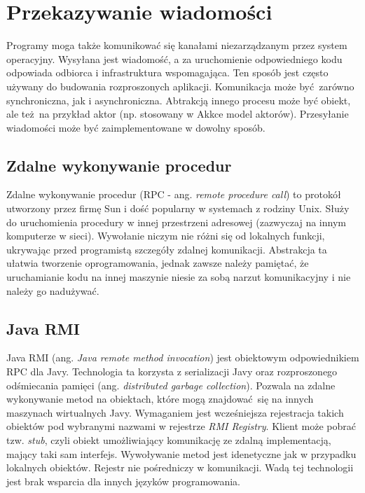 \section{Przekazywanie wiadomości}

Programy moga także komunikować się kanałami niezarządzanym przez system operacyjny. Wysyłana jest wiadomość, a za uruchomienie odpowiedniego kodu odpowiada odbiorca i infrastruktura wspomagająca. Ten sposób jest często używany do budowania rozproszonych aplikacji. Komunikacja może być zarówno synchroniczna, jak i asynchroniczna. Abtrakcją innego procesu może być obiekt, ale też na przykład aktor (np. stosowany w Akkce\cite{akka} model aktorów). Przesyłanie wiadomości może być zaimplementowane w dowolny sposób.


\subsection{Zdalne wykonywanie procedur}

Zdalne wykonywanie procedur (RPC - ang. \textit{remote procedure call}) to protokół utworzony przez firmę Sun\cite{rpc} i dość popularny w systemach z rodziny Unix. Służy do uruchomienia procedury w innej przestrzeni adresowej (zazwyczaj na innym komputerze w sieci). Wywołanie niczym nie różni się od lokalnych funkcji, ukrywając przed programistą szczegóły zdalnej komunikacji. Abstrakcja ta ułatwia tworzenie oprogramowania, jednak zawsze należy pamiętać, że uruchamianie kodu na innej maszynie niesie za sobą narzut komunikacyjny i nie należy go nadużywać.


\subsection{Java RMI}

Java RMI (ang. \textit{Java remote method invocation}) jest obiektowym odpowiednikiem RPC dla Javy. Technologia ta korzysta z serializacji Javy oraz rozproszonego odśmiecania pamięci (ang. \textit{distributed garbage collection}). Pozwala na zdalne wykonywanie metod na obiektach, które mogą znajdować się na innych maszynach wirtualnych Javy. Wymaganiem jest wcześniejsza rejestracja takich obiektów pod wybranymi nazwami w rejestrze \textit{RMI Registry}. Klient może pobrać tzw. \textit{stub}, czyli obiekt umożliwiający komunikację ze zdalną implementacją, mający taki sam interfejs. Wywoływanie metod jest idenetyczne jak w przypadku lokalnych obiektów. Rejestr nie pośredniczy w komunikacji. Wadą tej technologii jest brak wsparcia dla innych języków programowania.


